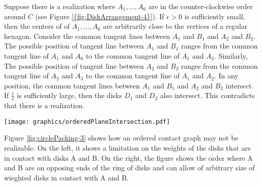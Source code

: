 \documentclass[10pt]{CSUNthesis}
\theoremstyle{plain}%
\theoremstyle{definition}
\theoremstyle{remark}
\begin{document}
Suppose there is a realization where $A_1, \ldots, A_6$ are in the counter-clockwise order around $C$ (see Figure \ref{{fig:DiskArrangement-4}}).
If $\epsilon>0$ is sufficiently small, then the centers of of $A_1, \ldots, A_6$ are arbitrarily close to the vertices of a regular hexagon.
Consider the common tangent lines between $A_1$ and $B_1$ and $A_2$ and $B_2$.
The possible position of tangent line between $A_1$ and $B_1$ ranges from the common tangent line of $A_1$ and $A_6$ to the common tangent line of $A_1$ and $A_2$.
Similarly, The possible position of tangent line between $A_2$ and $B_2$ ranges from the common tangent line of $A_2$ and $A_3$ to the common tangent line of $A_1$ and $A_2$.
In any position, the common tangent lines between $A_1$ and $B_1$ and $A_2$ and $B_2$ intersect.
If $\frac{1}{\epsilon}$ is sufficiently large, then the disks $D_1$ and $D_2$ also intersect.
This contradicts that there is a realization.

\begin{minipage}{\linewidth}\begin{center}
\texttt{[image: graphics/orderedPlaneIntersection.pdf]}
\end{center}
\label{fig:DiskArrangement-4}
\end{minipage}

Figure \ref{fig:circlePacking-3} shows how an ordered contact graph may not be realizable.  
On the left, it shows a limitation on the weights of the disks that are in contact with disks A and B. 
On the right, the figure shows the order where A and B are on opposing ends of the ring of disks and can allow of arbitrary size of wieghted disks in contact with A and B.

\end{document}
